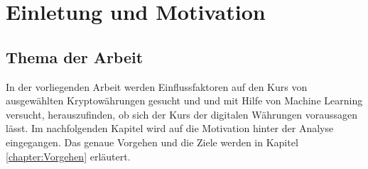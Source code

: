 \chapter{Einletung und Motivation}\label{chap:motivation}

\section{Thema der Arbeit}\label{sec:thema}
In der vorliegenden Arbeit werden Einflussfaktoren auf den Kurs von ausgewählten Kryptowährungen gesucht und und mit Hilfe von Machine Learning versucht, herauszufinden, ob sich der Kurs der digitalen Währungen voraussagen lässt. Im nachfolgenden Kapitel wird auf die Motivation hinter der Analyse eingegangen. Das genaue Vorgehen und die Ziele werden in Kapitel \ref{chapter:Vorgehen} erläutert.

